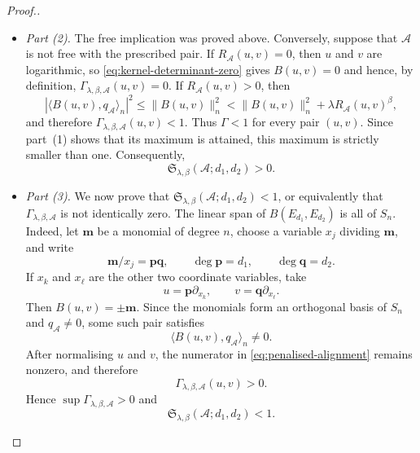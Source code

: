 \documentclass[10pt,a4paper]{amsart}
\begin{document}
\begin{proof}[Proof.]
\begin{itemize}
\item \emph{Part (2).}
The free implication was proved above. Conversely, suppose that $\mathcal{A}$
is not free with the prescribed pair. If
$R_{\mathcal{A}}(u,v)=0$, then $u$ and $v$ are logarithmic, so
\eqref{eq:kernel-determinant-zero} gives $B(u,v)=0$ and hence, by definition,
$\Gamma_{\lambda,\beta,\mathcal{A}}(u,v)=0$. If
$R_{\mathcal{A}}(u,v)>0$, then
\[
|\langle B(u,v),q_{\mathcal{A}}\rangle_n|^2
\leq \|B(u,v)\|_n^2
<
\|B(u,v)\|_n^2+\lambda R_{\mathcal{A}}(u,v)^\beta,
\]
and therefore
$\Gamma_{\lambda,\beta,\mathcal{A}}(u,v)<1$. Thus $\Gamma<1$ for every
pair $(u,v)$. Since part~(1) shows that its maximum is attained, this maximum
is strictly smaller than one. Consequently,
\[
\mathfrak S_{\lambda,\beta}(\mathcal{A};d_1,d_2)>0.
\]

\item \emph{Part (3).}
We now prove that $\mathfrak S_{\lambda,\beta}(\mathcal{A};d_1,d_2)<1$, or equivalently that $\Gamma_{\lambda,\beta,\mathcal{A}}$ is not identically zero. The linear span of $B(E_{d_1},E_{d_2})$ is all of $S_n$. Indeed, let $\mathbf{m}$ be a monomial of degree $n$, choose a variable $x_j$ dividing $\mathbf{m}$, and write
\[
\mathbf{m}/x_j=\mathbf{pq},
\qquad
\deg \mathbf{p}=d_1,\qquad
\deg \mathbf{q}=d_2.
\]
If $x_k$ and $x_\ell$ are the other two coordinate variables, take
\[
u=\mathbf{p}\partial_{x_k},
\qquad
v=\mathbf{q}\partial_{x_\ell}.
\]
Then $B(u,v)=\pm \mathbf{m}$. Since the monomials form an orthogonal basis of $S_n$
and $q_{\mathcal{A}}\neq0$, some such pair satisfies
\[
\langle B(u,v),q_{\mathcal{A}}\rangle_n\neq0.
\]
After normalising $u$ and $v$, the numerator in \eqref{eq:penalised-alignment} remains nonzero, and therefore
\[
\Gamma_{\lambda,\beta,\mathcal{A}}(u,v)>0.
\]
Hence $\sup\Gamma_{\lambda,\beta,\mathcal{A}}>0$ and
\[
\mathfrak S_{\lambda,\beta}(\mathcal{A};d_1,d_2)<1.
\]



\end{itemize}
\end{proof}
\end{document}
